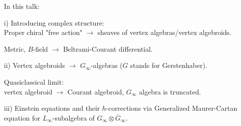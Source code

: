 \documentclass[9pt]{beamer}
\begin{document}
\begin{frame}

In this talk:\\

\vspace*{3mm}

i) Introducing complex structure: \\
\vspace*{1mm}
Proper chiral "free action" $\to$  
sheaves of vertex algebras/vertex algebroids.\\ 

\vspace*{1mm} 
 
Metric, $B$-field $\to$ Beltrami-Courant differential.

\vspace*{3mm}

ii) Vertex algebroids $\to$ $G_{\infty}$-algebras ($G$ stands for Gerstenhaber). \\

\vspace*{1mm}
  
Quasiclassical limit:\\ 
vertex algebroid $\to$ Courant algebroid, $G_{\infty}$ algebra is truncated.

\vspace*{3mm}

iii) Einstein equations and their $h$-corrections via Generalized Maurer-Cartan equation for $L_{\infty}$-subalgebra of $G_{\infty}\otimes \bar{G}_{\infty}$.



\end{frame}

\end{document}
